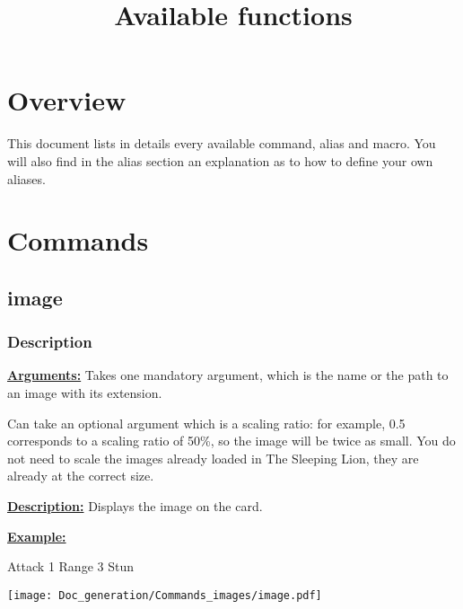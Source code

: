 \documentclass{article}
\title{Available functions}
\date{}
\begin{document}
\maketitle
\tableofcontents

\section{Overview}
This document lists in details every available command, alias and macro. You will also find in the alias section an explanation as to how to define your own aliases.

\section{Commands}
\subsection{image}
\subsubsection{Description}

\textbf{\underline{Arguments:}} Takes one mandatory argument, which is the name or the path to an image with its extension.

Can take an optional argument which is a scaling ratio: for example, 0.5 corresponds to a scaling ratio of 50\%, so the image will be twice as small. You do not need to scale the images already loaded in The Sleeping Lion, they are already at the correct size.

\textbf{\underline{Description:}} Displays the image on the card. 

\textbf{\underline{Example:}}

\begin{minipage}{0.45\linewidth}
\raggedright
\begin{spverbatim}
Attack  1
  Range  3
  Stun 

\end{spverbatim}
\end{minipage}
\begin{minipage}{0.45\linewidth}
\raggedleft
\texttt{[image: Doc\_generation/Commands\_images/image.pdf]}
\end{minipage} 
\end{document}
